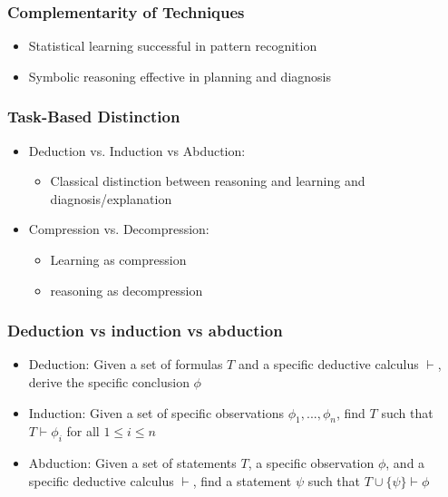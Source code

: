 \documentclass{beamer}
\begin{document}
\begin{frame}
\frametitle{Complementarity of Techniques}
\begin{itemize}
\item Statistical learning successful in pattern recognition
\item Symbolic reasoning effective in planning and diagnosis
\end{itemize}
\end{frame}

\begin{frame}
\frametitle{Task-Based Distinction}
\begin{itemize}
\item Deduction vs. Induction vs Abduction:
  \begin{itemize}
  \item Classical distinction between reasoning and learning and diagnosis/explanation
  \end{itemize}
\item Compression vs. Decompression:
  \begin{itemize}
  \item Learning as compression
  \item reasoning as decompression
  \end{itemize}
\end{itemize}
\end{frame}

\begin{frame}
  \frametitle{Deduction vs induction vs abduction}
  \begin{itemize}
  \item Deduction: Given a set of formulas $T$ and a specific
    deductive calculus $\vdash$, derive the specific conclusion
    $\phi$
    \pause
  \item Induction: Given a set of specific observations
    $\phi_1,...,\phi_n$, find $T$ such that $T \vdash \phi_i$ for all
    $1 \leq i \leq n$
    \pause
  \item Abduction: Given a set of statements $T$, a specific
    observation $\phi$, and a specific deductive calculus $\vdash$,
    find a statement $\psi$ such that
    $T \cup \{ \psi \} \vdash \phi$
  \end{itemize}
\end{frame}
\end{document}

